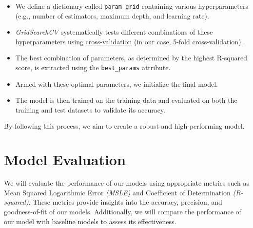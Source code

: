 \documentclass[conference]{IEEEtran}
\begin{document}
    \begin{itemize}
        \item We define a dictionary called \texttt{param\_grid} containing various hyperparameters (e.g., number of estimators, maximum depth, and learning rate).
        \item \textit{GridSearchCV} systematically tests different combinations of these hyperparameters using \href{https://scikit-learn.org/stable/modules/cross_validation.html}{cross-validation} (in our case, 5-fold cross-validation).
        \item The best combination of parameters, as determined by the highest R-squared score, is extracted using the \texttt{best\_params} attribute.
        \item Armed with these optimal parameters, we initialize the final model.
        \item The model is then trained on the training data and evaluated on both the training and test datasets to validate its accuracy.
    \end{itemize}
    
    By following this process, we aim to create a robust and high-performing model.

\section{Model Evaluation}
    We will evaluate the performance of our models using appropriate metrics such as Mean Squared Logarithmic Error \textit{(MSLE)} and Coefficient of Determination \textit{(R-squared)}. These metrics provide insights into the accuracy, precision, and goodness-of-fit of our models. Additionally, we will compare the performance of our model with baseline models to assess its effectiveness.
    
\end{document}

